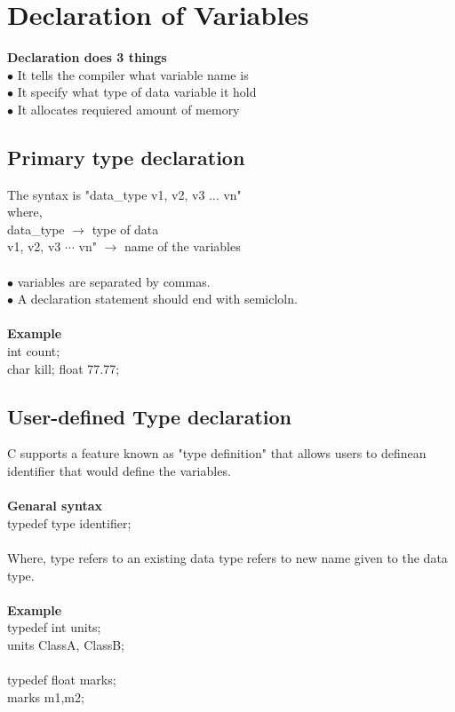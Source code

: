 \documentclass{article}
\begin{document}
	\newpage
	
	\section{Declaration of Variables}
	\textbf{Declaration does 3 things} \\
	$\bullet$ It tells the compiler what variable name is \\
	$\bullet$ It specify what type of data variable it hold \\
	$\bullet$ It allocates requiered amount of memory
	
	\subsection{Primary type declaration}
	The syntax is "data\_type v1, v2, v3 $\dots$ vn" \\
	where, \\
	\tab \tab data\_type \hspace{1.525cm} $\longrightarrow$ type of data \\
	\tab \tab v1, v2, v3 $\cdots$ vn" \hspace{0.394cm} $\longrightarrow$  name of the variables
	\\ \\
	$\bullet$ variables are separated by commas. \\
	$\bullet$ A declaration statement should end with semicloln.
	\\ \\ 
	\textbf{Example} \\
	int count; \\
	char kill;
	float 77.77;
	
	\subsection{User-defined Type declaration}
	C supports a feature known as "type definition" that allows users to definean identifier that would define the variables.
	\\ \\
	\textbf{Genaral syntax} \\ 
	\tab \tab typedef type identifier;
	\\ \\
	Where, type refers to an existing data type refers to new name given to the data type.
	\\ \\
	\textbf{Example} \\
	typedef int units; \\
	\tab \tab units ClassA, ClassB;
	\\ \\
	typedef float marks; \\
	\tab \tab marks m1,m2;
	
\end{document}
